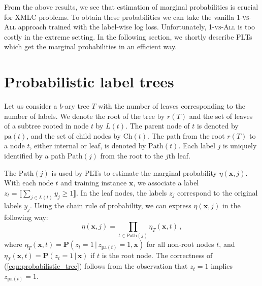 \documentclass{article}
\newcommand{\Algo}[1]{\textsc{#1}}
\renewcommand{\vec}[1]{\boldsymbol{#1}}
\newcommand{\bx}{\vec{x}}
\newcommand{\pa}[1]{\mathrm{pa}(#1)}
\newcommand{\Path}[1]{\mathrm{Path}(#1)}
\newcommand{\Children}[1]{\mathrm{Ch}(#1)}
\newcommand{\prob}{\mathbf{P}}
\newcommand{\assert}[1]{\llbracket #1 \rrbracket}
\newcommand{\given}{\, | \,}
\newcommand{\sectionBefore}{-0pt}
\newcommand{\sectionAfter}{-0pt}
\begin{document}
From the above results, we see that estimation of marginal probabilities is crucial for XMLC problems. To obtain these probabilities we can take the vanilla \Algo{1-vs-All} approach trained with the label-wise log loss. Unfortunately, \Algo{1-vs-All} is too costly in the extreme setting. In the following section, we shortly describe PLTs which get the marginal probabilities in an efficient way. 


\vspace{\sectionBefore}
\section{Probabilistic label trees}
\label{sec:plt}
\vspace{\sectionAfter}

Let us consider a $b$-ary tree $T$ with the number of leaves corresponding to the number of labels. We denote the root of the tree by $r(T)$ and the set of leaves of a subtree rooted in node $t$ by $L(t)$. The parent node of $t$ is denoted by $\pa{t}$, and the set of child nodes by $\Children{t}$. The path from the root $r(T)$ to a node $t$, either internal or leaf, is denoted by $\Path{t}$. 
%
Each label $j$ is uniquely identified by a path $\Path{j}$ from the root to the $j$\/th leaf. %

The $\Path{j}$ is used by \Algo{PLT}s to estimate the marginal probability $\eta(\bx, j)$.
With each node $t$ and training instance $\bx$, we associate a label $z_t = \assert{\textstyle \sum_{j \in L(t)} y_j \ge 1}$.
In the leaf nodes, the labels $z_j$ correspond to the original labels $y_j$.
Using the chain rule of probability, we can express $\eta(\bx, j)$ in the following way:
\begin{equation}
\eta(\bx, j) = \prod_{t \in \Path{j}} \eta_T(\bx, t)\,,
\label{eqn:probabilistic_tree}
\end{equation}
where $\eta_T(\bx, t) = \prob(z_t = 1 \given z_{\pa{t}} =1, \bx)$ for all non-root nodes $t$, and $\eta_T(\bx, t) = \prob(z_t = 1 \given \bx)$ if $t$ is the root node. 
The correctness of (\ref{eqn:probabilistic_tree}) follows from the observation that $z_{t} = 1$ implies $z_{\pa{t}} = 1$. %
\end{document}
